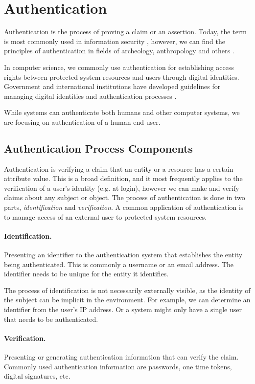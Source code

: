 \section{Authentication}

Authentication is the process of proving a claim or an assertion.
Today, the term is most commonly used in information security \cite{shirey2007internet}, however, we can find the principles of authentication in fields of archeology, anthropology and others \cite{Odegaard2014}.

In computer science, we commonly use authentication for establishing access rights between protected system resources and users through digital identities.
Government and international institutions have developed guidelines for managing digital identities and authentication processes \cite{grassi2017}.

While systems can authenticate both humans and other computer systems, we are focusing on authentication of a human end-user.

\subsection{Authentication Process Components}
Authentication \cite{shirey2007internet} is verifying a claim that an entity or a resource has a certain attribute value.
This is a broad definition, and it most frequently applies to the verification of a user's identity (e.g. at login), however we can make and verify claims about any subject or object.
The process of authentication is done in two parts, \textit{identification} and \textit{verification}.
A common application of authentication is to manage access of an external user to protected system resources.

\paragraph{Identification.} Presenting an identifier to the authentication system that establishes the entity being authenticated. This is commonly a username or an email address. The identifier needs to be unique for the entity it identifies.

The process of identification is not necessarily externally visible, as the identity of the subject can be implicit in the environment. 
For example, we can determine an identifier from the user’s IP address.
Or a system might only have a single user that needs to be authenticated.

\paragraph{Verification.} Presenting or generating authentication information that can verify the claim.
Commonly used authentication information are passwords, one time tokens, digital signatures, etc.

